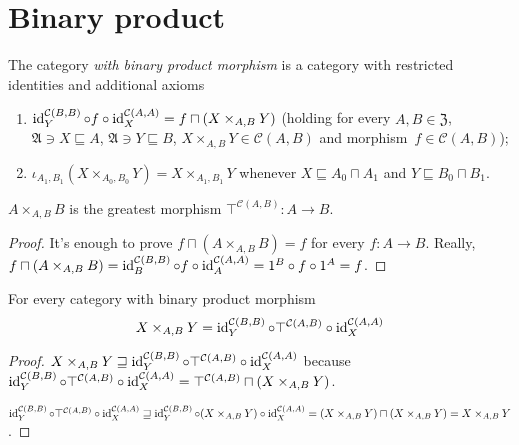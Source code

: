 \section{Binary product}

\begin{defn}
The category \emph{with binary product morphism}
is a category with restricted identities and additional axioms
\begin{enumerate}
\item $\operatorname{id}^{\mathcal{C}(B,B)}_Y\circ f\circ\operatorname{id}^{\mathcal{C}(A,A)}_X=f\sqcap(X\times_{A,B}Y)$
(holding for every $A,B\in\mathfrak{Z}$,
$\mathfrak{A}\ni X\sqsubseteq A$,
$\mathfrak{A}\ni Y\sqsubseteq B$,
$X\times_{A,B}Y\in\mathcal{C}(A,B)$
and morphism~$f\in\mathcal{C}(A,B)$);
\item $\iota_{A_1,B_1}(X\times_{A_0,B_0}Y)=
X\times_{A_1,B_1}Y$ whenever
$X\sqsubseteq A_0\sqcap A_1$ and $Y\sqsubseteq B_0\sqcap B_1$.
\end{enumerate}
\end{defn}

\begin{prop}
$A\times_{A,B}B$ is the greatest morphism
$\top^{\mathcal{C}(A,B)}:A\to B$.
\end{prop}

\begin{proof}
It's enough to prove $f\sqcap(A\times_{A,B}B)=f$ for every
$f:A\to B$. Really,
$f\sqcap(A\times_{A,B}B)=
\operatorname{id}^{\mathcal{C}(B,B)}_B\circ f\circ\operatorname{id}^{\mathcal{C}(A,A)}_A=
1^B\circ f\circ 1^A=f$.
\end{proof}

\begin{prop}
For every category with binary product morphism
\[X\times_{A,B}Y=
\operatorname{id}^{\mathcal{C}(B,B)}_Y\circ\top^{\mathcal{C}(A,B)}\circ
\operatorname{id}^{\mathcal{C}(A,A)}_X\]
\end{prop}

\begin{proof}
$X\times_{A,B}Y\sqsupseteq
\operatorname{id}^{\mathcal{C}(B,B)}_Y\circ\top^{\mathcal{C}(A,B)}\circ\operatorname{id}^{\mathcal{C}(A,A)}_X$
because
$\operatorname{id}^{\mathcal{C}(B,B)}_Y\circ\top^{\mathcal{C}(A,B)}\circ\operatorname{id}^{\mathcal{C}(A,A)}_X=
\top^{\mathcal{C}(A,B)}\sqcap(X\times_{A,B}Y)$.

$\operatorname{id}^{\mathcal{C}(B,B)}_Y\circ\top^{\mathcal{C}(A,B)}\circ\operatorname{id}^{\mathcal{C}(A,A)}_X\sqsupseteq
\operatorname{id}^{\mathcal{C}(B,B)}_Y\circ(X\times_{A,B}Y)\circ
\operatorname{id}^{\mathcal{C}(A,A)}_X=
(X\times_{A,B}Y)\sqcap(X\times_{A,B}Y)=X\times_{A,B}Y$.
\end{proof}

